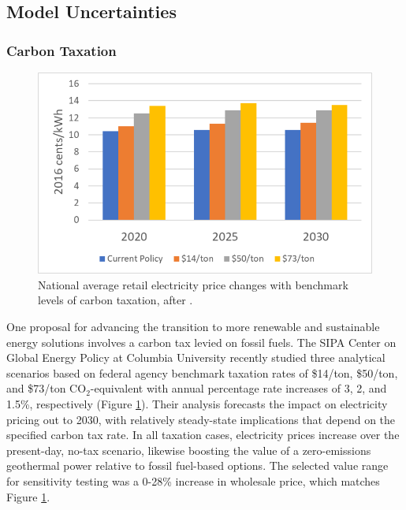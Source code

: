 \subsection{Model Uncertainties}\label{ch4:model_uncertainties}
\subsubsection{Carbon Taxation}\label{ch4:carbon_tax_uncertainty}
\begin{figure}
\centering
\includegraphics[scale=0.6]{templates/images/Figure-Carbon_Tax_Price_Impact.png}
\singlespacing
\caption[Carbon tax price impact]{National average retail electricity price changes with benchmark levels of carbon taxation, after \protect\citep[Figure\ 30]{larson_energy_2018}.}
\label{fig:carbon_tax_pricing}
\end{figure}
One proposal for advancing the transition to more renewable and sustainable energy solutions involves a carbon tax levied on fossil fuels. The SIPA Center on Global Energy Policy at Columbia University recently studied three analytical scenarios based on federal agency benchmark taxation rates of \$14/ton, \$50/ton, and \$73/ton CO$_2$-equivalent with annual percentage rate increases of 3, 2, and 1.5\%, respectively \citep{larson_energy_2018} (Figure \ref{fig:carbon_tax_pricing}). Their analysis forecasts the impact on electricity pricing out to 2030, with relatively steady-state implications that depend on the specified carbon tax rate. In all taxation cases, electricity prices increase over the present-day, no-tax scenario, likewise boosting the value of a zero-emissions geothermal power relative to fossil fuel-based options. The selected value range for sensitivity testing was a 0-28\% increase in wholesale price, which matches Figure \ref{fig:carbon_tax_pricing}.

